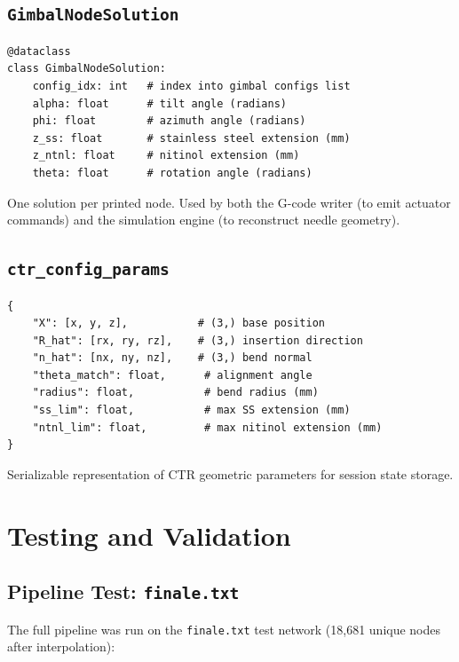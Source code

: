 \documentclass[11pt,a4paper]{article}
\begin{document}
\subsection{\texttt{GimbalNodeSolution}}

\begin{lstlisting}
@dataclass
class GimbalNodeSolution:
    config_idx: int   # index into gimbal configs list
    alpha: float      # tilt angle (radians)
    phi: float        # azimuth angle (radians)
    z_ss: float       # stainless steel extension (mm)
    z_ntnl: float     # nitinol extension (mm)
    theta: float      # rotation angle (radians)
\end{lstlisting}

One solution per printed node. Used by both the G-code writer (to emit actuator commands) and the simulation engine (to reconstruct needle geometry).

\subsection{\texttt{ctr\_config\_params}}

\begin{lstlisting}
{
    "X": [x, y, z],           # (3,) base position
    "R_hat": [rx, ry, rz],    # (3,) insertion direction
    "n_hat": [nx, ny, nz],    # (3,) bend normal
    "theta_match": float,      # alignment angle
    "radius": float,           # bend radius (mm)
    "ss_lim": float,           # max SS extension (mm)
    "ntnl_lim": float,         # max nitinol extension (mm)
}
\end{lstlisting}

Serializable representation of CTR geometric parameters for session state storage.

\section{Testing and Validation}
\label{sec:testing}

\subsection{Pipeline Test: \texttt{finale.txt}}

The full pipeline was run on the \texttt{finale.txt} test network (18,681 unique nodes after interpolation):
\end{document}
